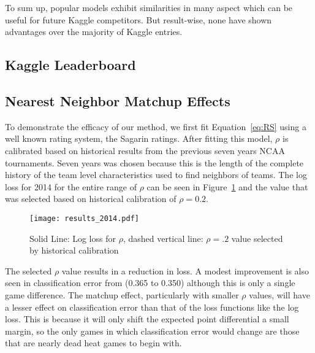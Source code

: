To sum up, popular models exhibit similarities in many aspect which can be useful for future Kaggle competitors. But result-wise, none have shown advantages over the majority of Kaggle entries. 

\subsection{Kaggle Leaderboard}
\subsection{Nearest Neighbor Matchup Effects}
To demonstrate the efficacy of our method, we first fit Equation~\ref{eq:RS} using a well known rating system, the Sagarin ratings. After fitting this model, $\rho$ is calibrated based on historical results from the previous seven years NCAA tournaments. Seven years was chosen because this is the length of the complete history of the team level characteristics used to find neighbors of teams. The log loss for 2014 for the entire range of $\rho$ can be seen in Figure~\ref{fig:result} and the value that was selected based on historical calibration of $\rho =0.2$.
\begin{figure}[h!]
\centering
\texttt{[image: results\_2014.pdf]}
\caption{Solid Line: Log loss for $\rho$, dashed vertical line: $\rho=.2$ value selected by historical calibration}
\label{fig:result}
\end{figure} 
The selected $\rho$ value results in a reduction in loss. A modest improvement is also seen in classification error from (0.365 to 0.350) although this is only a single game difference. The matchup effect, particularly with smaller $\rho$ values, will have a lesser effect on classification error than that of the loss functions like the log loss. This is because it will only shift the expected point differential a small margin, so the only games in which classification error would change are those that are nearly dead heat games to begin with.

